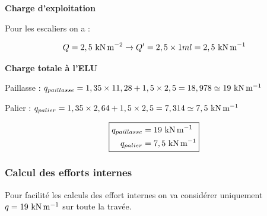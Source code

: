 \vspace{\baselineskip}


\textbf{Charge d'exploitation}

Pour les escaliers on a :

\[ Q = 2,5\knms \rightarrow Q' = 2,5 \times 1ml = 2,5\knm \]


\vspace{\baselineskip}

\textbf{Charge totale à l'ELU}

Paillasse : $q_{paillasse} = 1,35 \times 11,28 + 1,5 \times 2,5 = 18,978 \simeq
19\knm $

\vspace{\baselineskip}

Palier : $q_{palier} = 1,35 \times 2,64 + 1,5 \times 2,5 = 7,314 \simeq
7,5\knm$


\[ \fbox{$\begin{aligned}
		q_{paillasse} &= 19\knm \\
		q_{palier} &= 7,5\knm
	\end{aligned}$} \]



\subsubsection{Calcul des efforts internes}



\begin{figure}[H]
	\centering
\end{figure}

Pour facilité les calculs des effort internes on va considérer uniquement $q =
19\knm$ sur toute la travée.


